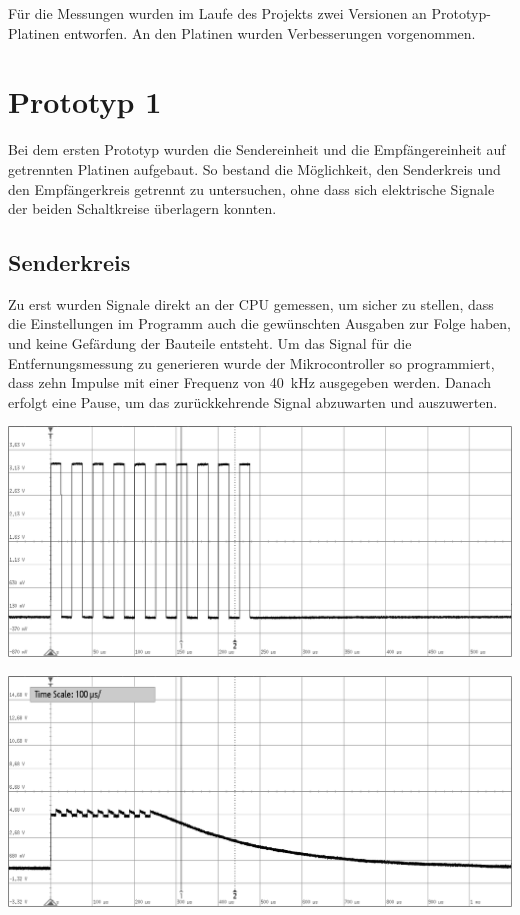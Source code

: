 Für die Messungen wurden im Laufe des Projekts zwei Versionen an Prototyp-Platinen entworfen. An den Platinen wurden Verbesserungen vorgenommen. 
\section{Prototyp 1}
Bei dem ersten Prototyp wurden die Sendereinheit und die Empfängereinheit auf getrennten Platinen aufgebaut. So bestand die Möglichkeit, den Senderkreis und den Empfängerkreis getrennt zu untersuchen, ohne dass sich elektrische Signale der beiden Schaltkreise überlagern konnten.

\subsection{Senderkreis}
Zu erst wurden Signale direkt an der CPU gemessen, um sicher zu stellen, dass die Einstellungen im Programm auch die gewünschten Ausgaben zur Folge haben, und keine Gefärdung der Bauteile entsteht.
Um das Signal für die Entfernungsmessung zu generieren wurde der Mikrocontroller so programmiert, dass zehn Impulse mit einer Frequenz von 40~kHz ausgegeben werden. Danach erfolgt eine Pause, um das zurückkehrende Signal abzuwarten und auszuwerten.\\
\begin{minipage}{0.5\textwidth}
\includegraphics[width=1\textwidth%
]{Abbildungen/MessungenP1/PWM-von-der-cpu.png}
\label{fig:pwm-burst}
\end{minipage}
\begin{minipage}{0.5\textwidth}
\includegraphics[width=1\textwidth%
]{Abbildungen/MessungenP1/PWM-ausgabe-mit-Hi-Side.png}
\label{fig:HiSide}
\end{minipage}
